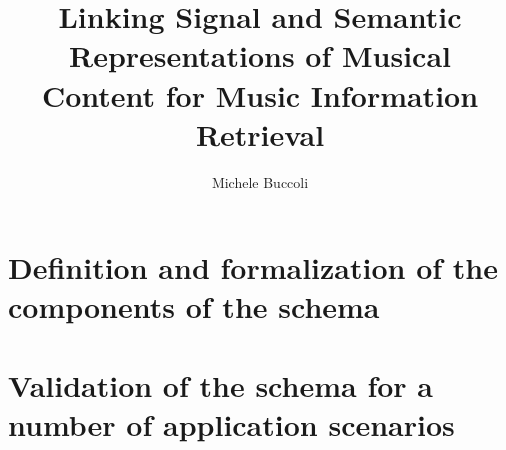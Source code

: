 \documentclass[a4,11pt,twoside,openright,italian,english]{book}%
\author{Michele Buccoli}
\title{Linking Signal and Semantic Representations of Musical Content for Music Information Retrieval}
\theoremstyle{definition} %
\theoremstyle{plain} %
\theoremstyle{remark} %
\begin{document}

\maketitle

\pagestyle{empty}
\cleardoublepage
\newpage


\cleardoublepage
\newpage



\cleardoublepage
\newpage

\pagestyle{fancy}
\setcounter{page}{1}








\tableofcontents
\cleardoublepage
\listoffigures
\cleardoublepage
\listoftables
\newpage

\setcounter{page}{1}

\cleardoublepage
\part{Definition and formalization of the components of the schema}



\part{Validation of the schema for a number of application scenarios}





\cleardoublepage
\begin{appendices}

%
%
\end{appendices}

\cleardoublepage
{}
{}
%


\end{document}

